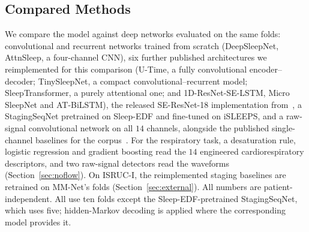 \documentclass[a4paper,fleqn]{cas-sc}
\begin{document}
\subsection{Compared Methods}
We compare the model against deep networks evaluated on the same folds: convolutional and
recurrent networks trained from scratch (DeepSleepNet, AttnSleep, a four-channel CNN),
six further published architectures we reimplemented for this comparison (U-Time, a
fully convolutional encoder--decoder; TinySleepNet, a compact convolutional--recurrent model;
SleepTransformer, a purely attentional one; and 1D-ResNet-SE-LSTM, Micro SleepNet and
AT-BiLSTM), the released SE-ResNet-18 implementation from~\cite{bose2026gap}, a
StagingSeqNet pretrained on Sleep-EDF and fine-tuned on iSLEEPS, and a raw-signal convolutional network on all $14$ channels,
alongside the published single-channel baselines for the corpus~\cite{maiti2026isleeps}. For the
respiratory task, a desaturation rule, logistic regression and gradient boosting read the $14$
engineered cardiorespiratory descriptors, and two raw-signal detectors read the waveforms
(Section~\ref{sec:noflow}). On ISRUC-I, the reimplemented staging baselines are retrained on
MM-Net's folds (Section~\ref{sec:external}). All numbers are
patient-independent. All use ten folds except the Sleep-EDF-pretrained StagingSeqNet, which uses five; hidden-Markov decoding is applied where the corresponding model provides it.
\end{document}
